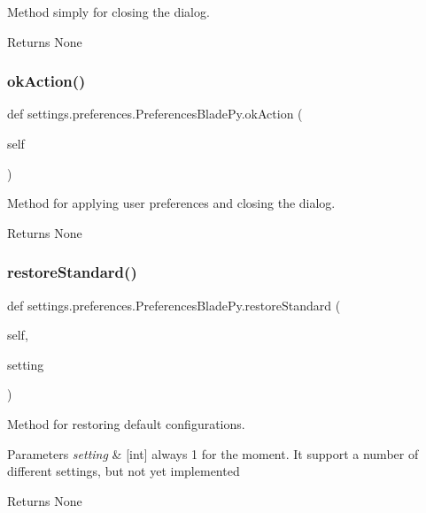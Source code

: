 Method simply for closing the dialog. 

\begin{DoxyReturn}{Returns}
None 
\end{DoxyReturn}
\hypertarget{a00109_a7e99113696fefa62dfdeb2ba1279350c}{}\label{a00109_a7e99113696fefa62dfdeb2ba1279350c} 
\subsubsection{\texorpdfstring{ok\+Action()}{okAction()}}
{\footnotesize\ttfamily def settings.\+preferences.\+Preferences\+Blade\+Py.\+ok\+Action (\begin{DoxyParamCaption}\item[{}]{self }\end{DoxyParamCaption})}



Method for applying user preferences and closing the dialog. 

\begin{DoxyReturn}{Returns}
None 
\end{DoxyReturn}
\hypertarget{a00109_ab74be9049535f502252efb2df560ac8e}{}\label{a00109_ab74be9049535f502252efb2df560ac8e} 
\subsubsection{\texorpdfstring{restore\+Standard()}{restoreStandard()}}
{\footnotesize\ttfamily def settings.\+preferences.\+Preferences\+Blade\+Py.\+restore\+Standard (\begin{DoxyParamCaption}\item[{}]{self,  }\item[{}]{setting }\end{DoxyParamCaption})}



Method for restoring default configurations. 


\begin{DoxyParams}{Parameters}
{\em setting} & \mbox{[}int\mbox{]} always 1 for the moment. It support a number of different settings, but not yet implemented \\
\hline
\end{DoxyParams}
\begin{DoxyReturn}{Returns}
None 
\end{DoxyReturn}
\hypertarget{a00109_a9cfbfd7abab4ba14d80c573a0534040b}{}\label{a00109_a9cfbfd7abab4ba14d80c573a0534040b} 
